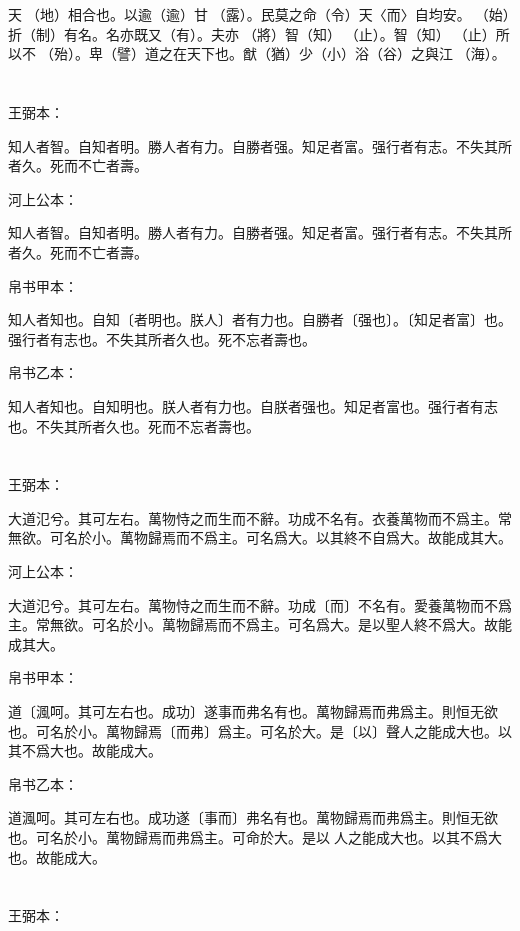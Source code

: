 \documentclass[a5paper]{ctexbook}
\begin{document}
    天󶴵（地）相合也。以逾（逾）甘𩂣（露）。民莫之命（令）天〈而〉自均安。󶴪（始）折（制）有名。名亦既又（有）。夫亦𨟻（將）智（知）𣥕（止）。智（知）𣥕（止）所以不󶴪（殆）。卑（譬）道之在天下也。猷（猶）少（小）浴（谷）之與江𣳠（海）。

    \chapter{}
    王弼本：

    知人者智。自知者明。勝人者有力。自勝者强。知足者富。强行者有志。不失其所者久。死而不亡者壽。

    河上公本：

    知人者智。自知者明。勝人者有力。自勝者强。知足者富。强行者有志。不失其所者久。死而不亡者壽。

    帛书甲本：

    知人者知也。自知〔者明也。朕人〕者有力也。自勝者〔强也〕。〔知足者富〕也。强行者有志也。不失其所者久也。死不忘者壽也。

    帛书乙本：

    知人者知也。自知明也。朕人者有力也。自朕者强也。知足者富也。强行者有志也。不失其所者久也。死而不忘者壽也。

    \chapter{}
    王弼本：

    大道氾兮。其可左右。萬物恃之而生而不辭。功成不名有。衣養萬物而不爲主。常無欲。可名於小。萬物歸焉而不爲主。可名爲大。以其終不自爲大。故能成其大。

    河上公本：

    大道氾兮。其可左右。萬物恃之而生而不辭。功成〔而〕不名有。愛養萬物而不爲主。常無欲。可名於小。萬物歸焉而不爲主。可名爲大。是以聖人終不爲大。故能成其大。

    帛书甲本：

    道〔渢呵。其可左右也。成功〕遂事而弗名有也。萬物歸焉而弗爲主。則恒无欲也。可名於小。萬物歸焉〔而弗〕爲主。可名於大。是〔以〕聲人之能成大也。以其不爲大也。故能成大。

    帛书乙本：

    道渢呵。其可左右也。成功遂〔事而〕弗名有也。萬物歸焉而弗爲主。則恒无欲也。可名於小。萬物歸焉而弗爲主。可命於大。是以𦔻人之能成大也。以其不爲大也。故能成大。

    \chapter{}
    王弼本：
\end{document}
